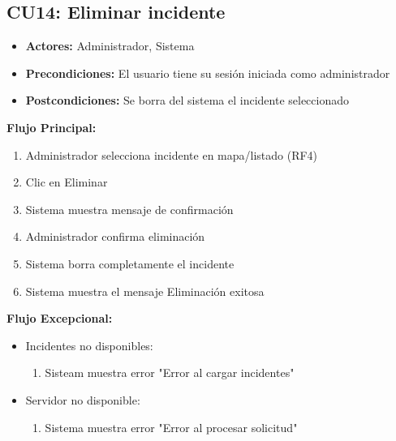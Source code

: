 \begin{multicols}{2}
\subsection*{CU14: Eliminar incidente}
\begin{itemize}
    \item \textbf{Actores:} Administrador, Sistema
    \item \textbf{Precondiciones:} El usuario tiene su sesión iniciada como administrador
    \item \textbf{Postcondiciones:} Se borra del sistema el incidente seleccionado
\end{itemize}
\textbf{Flujo Principal:}
\begin{enumerate}
     \item Administrador selecciona incidente en mapa/listado (RF4)
    \item Clic en Eliminar
    \item Sistema muestra mensaje de confirmación
    \item Administrador confirma eliminación
    \item Sistema borra completamente el incidente
    \item Sistema muestra el mensaje Eliminación exitosa
\end{enumerate}

\textbf{Flujo Excepcional:}
\begin{itemize}
    \item Incidentes no disponibles:
    \begin{enumerate}
        \item Sisteam muestra error "Error al cargar incidentes"
    \end{enumerate}
    \item Servidor no disponible:
    \begin{enumerate}
        \item Sistema muestra error "Error al procesar solicitud"
    \end{enumerate}
\end{itemize}


\end{multicols}
